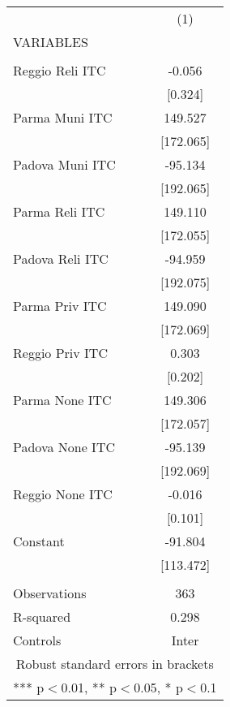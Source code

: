 \begin{tabular}{lc} \hline
 & (1) \\
VARIABLES &  \\ \hline
 &  \\
Reggio Reli ITC & -0.056 \\
 & [0.324] \\
Parma Muni ITC & 149.527 \\
 & [172.065] \\
Padova Muni ITC & -95.134 \\
 & [192.065] \\
Parma Reli ITC & 149.110 \\
 & [172.055] \\
Padova Reli ITC & -94.959 \\
 & [192.075] \\
Parma Priv ITC & 149.090 \\
 & [172.069] \\
Reggio Priv ITC & 0.303 \\
 & [0.202] \\
Parma None ITC & 149.306 \\
 & [172.057] \\
Padova None ITC & -95.139 \\
 & [192.069] \\
Reggio None ITC & -0.016 \\
 & [0.101] \\
Constant & -91.804 \\
 & [113.472] \\
 &  \\
Observations & 363 \\
R-squared & 0.298 \\
 Controls & Inter \\ \hline
\multicolumn{2}{c}{ Robust standard errors in brackets} \\
\multicolumn{2}{c}{ *** p$<$0.01, ** p$<$0.05, * p$<$0.1} \\
\end{tabular}
